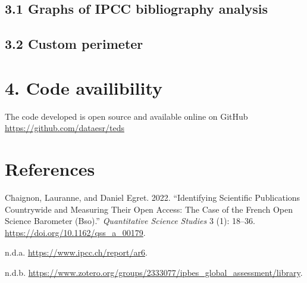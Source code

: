 \documentclass[
]{article}
\newlength{\cslhangindent}
\newenvironment{cslreferences}%
  {\setlength{\parindent}{0pt}%
  \everypar{\setlength{\hangindent}{\cslhangindent}}\ignorespaces}%
  {\par}
\begin{document}
\hypertarget{graphs-of-ipcc-bibliography-analysis}{%
\subsection{3.1 Graphs of IPCC bibliography
analysis}\label{graphs-of-ipcc-bibliography-analysis}}

\hypertarget{custom-perimeter}{%
\subsection{3.2 Custom perimeter}\label{custom-perimeter}}

\hypertarget{code-availibility}{%
\section{4. Code availibility}\label{code-availibility}}

The code developed is open source and available online on GitHub
\url{https://github.com/dataesr/teds}

\hypertarget{references}{%
\section*{References}\label{references}}

\hypertarget{refs}{}
\begin{cslreferences}
\leavevmode\hypertarget{ref-10.1162ux2fqss_a_00179}{}%
Chaignon, Lauranne, and Daniel Egret. 2022. ``Identifying Scientific
Publications Countrywide and Measuring Their Open Access: The Case of
the French Open Science Barometer (Bso).'' \emph{Quantitative Science
Studies} 3 (1): 18--36. \url{https://doi.org/10.1162/qss_a_00179}.

\leavevmode\hypertarget{ref-ipccbibliography}{}%
n.d.a. \url{https://www.ipcc.ch/report/ar6}.

\leavevmode\hypertarget{ref-ipbesbibliography}{}%
n.d.b.
\url{https://www.zotero.org/groups/2333077/ipbes_global_assessment/library}.
\end{cslreferences}
\end{document}
